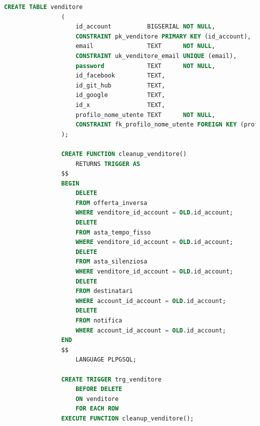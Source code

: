             \begin{lstlisting}[language=SQL, caption=Relazione venditore]
                CREATE TABLE venditore
                (
                    id_account          BIGSERIAL NOT NULL,
                    CONSTRAINT pk_venditore PRIMARY KEY (id_account),
                    email               TEXT      NOT NULL,
                    CONSTRAINT uk_venditore_email UNIQUE (email),
                    password            TEXT      NOT NULL,
                    id_facebook         TEXT,
                    id_git_hub          TEXT,
                    id_google           TEXT,
                    id_x                TEXT,
                    profilo_nome_utente TEXT      NOT NULL,
                    CONSTRAINT fk_profilo_nome_utente FOREIGN KEY (profilo_nome_utente) REFERENCES profilo (nome_utente) ON UPDATE CASCADE ON DELETE CASCADE
                );
                
                CREATE FUNCTION cleanup_venditore()
                    RETURNS TRIGGER AS
                $$
                BEGIN
                    DELETE
                    FROM offerta_inversa
                    WHERE venditore_id_account = OLD.id_account;
                    DELETE
                    FROM asta_tempo_fisso
                    WHERE venditore_id_account = OLD.id_account;
                    DELETE
                    FROM asta_silenziosa
                    WHERE venditore_id_account = OLD.id_account;
                    DELETE
                    FROM destinatari
                    WHERE account_id_account = OLD.id_account;
                    DELETE
                    FROM notifica
                    WHERE account_id_account = OLD.id_account;
                END
                $$
                    LANGUAGE PLPGSQL;
                
                CREATE TRIGGER trg_venditore
                    BEFORE DELETE
                    ON venditore
                    FOR EACH ROW
                EXECUTE FUNCTION cleanup_venditore();
            \end{lstlisting}
            
